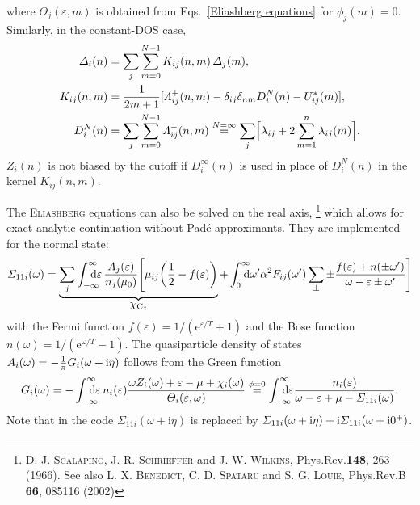 \documentclass[a4paper]{article}
\let\Re\relax
\let\Im\relax
\DeclareMathOperator\Re{Re}
\DeclareMathOperator\Im{Im}
\def\D{\mathrm d}
\def\E{\mathrm e}
\def\I{\mathrm i}
\def\sub#1{\sb{\mathrm{#1}}}
\def\from#1{\sb{\mathrlap{#1}}}
\def\till#1{\sp{\mathrlap{#1}}}
\let\Delta\varDelta
\let\epsilon\varepsilon
\let\Lambda\varLambda
\let\Sigma\varSigma
\let\Theta\varTheta
\newlength\gap
\begin{document}
   where $\Theta_j(\epsilon, m)$ is obtained from Eqs.~\ref{Eliashberg
   equations} for $\phi_j(m) = 0$. Similarly, in the constant-DOS case,
   \begin{equation}
      \begin{split}
         \Delta_i(n) &= \sum_j \sum_{m = 0}^{N - 1}
         K_{i j}(n, m) \, \Delta_j(m),
         \\
         K_{i j}(n, m) &= \frac 1 {2 m + 1} [\Lambda_{i j}^+(n, m)
         - \delta_{i j} \delta_{n m} D_i^N(n) - U^*_{i j}(m)],
         \\
         D_i^N(n) &= \sum_j \sum_{m = 0}^{N - 1} \Lambda_{i j}^-(n, m)
         \overset{N = \infty} =
         \sum_j \Bigl[ \lambda_{i j} + 2 \sum_{m = 1}^n \lambda_{i j}(m) \Bigr].
      \end{split}
      \label{linearized gap equation}
   \end{equation}
   $Z_i(n)$ is not biased by the cutoff if $D_i^\infty(n)$ is used in place of
   $D_i^N(n)$ in the kernel $K_{i j}(n, m)$.

   The \textsc{Eliashberg} equations can also be solved on the real axis,%
   \footnote{%
      D. J. \textsc{Scalapino}, J. R. \textsc{Schrieffer} and J. W.
      \textsc{Wilkins}, Phys.\@  Rev.\@ \textbf{148}, 263 (1966).
      \newline
      See also L. X. \textsc{Benedict}, C. D. \textsc{Spataru} and S. G.
      \textsc{Louie}, Phys.\@ Rev.\@ B \textbf{66}, 085116 (2002)
      }
   which allows for exact analytic continuation without Padé approximants. They
   are implemented for the normal state:
   \begin{equation}
      \varSigma_{1 1 i}(\omega) = \underbrace{
      \sum_j
      \int \from{-\infty} \till \infty \D \epsilon \,
      \frac{A_j(\epsilon)}{n_j(\mu_0)}
      \Biggl[
         \mu_{i j}
         \biggl( \frac12 - f(\epsilon) \biggr)
            }_{\displaystyle {\chi \sub C}_i}
         + \int \from 0 \till \infty \D \omega'
         \alpha^2 F_{i j}(\omega')
         \sum_\pm \pm \frac{f(\epsilon) + n(\pm \omega')}
            {\omega - \epsilon \pm \omega'}
      \Biggr]
      \label{real-axis equations}
   \end{equation}
   with the Fermi function $f(\epsilon) = 1 / (\E^{\epsilon / T} + 1)$ and the
   Bose function $n(\omega) = 1 / (\E^{\omega / T} - 1)$. The quasiparticle
   density of states $A_i(\omega) = -\frac 1 \pi \Im G_i(\omega + \I \eta)$
   follows from the Green function
   \begin{equation*}
      G_i(\omega) =
      -\int \from{-\infty} \till \infty \D \epsilon \,
      n_i(\epsilon)
      \frac{\omega Z_i(\omega)
         + \epsilon - \mu + \chi_i(\omega)}
         {\Theta_i(\epsilon, \omega)}
      \overset{\phi = 0} =
      \int \from{-\infty} \till \infty \D \epsilon
      \frac{n_i(\epsilon)}
         {\omega - \epsilon + \mu - \Sigma_{1 1 i}(\omega)}.
   \end{equation*}
   Note that in the code $\Sigma_{1 1 i}(\omega + \I \eta)$ is replaced by $\Re
   \Sigma_{1 1 i}(\omega + \I \eta) + \I \Im \Sigma_{1 1 i}(\omega + \I 0^+)$.
\end{document}
